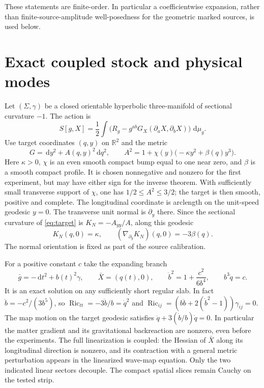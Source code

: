 \documentclass[11pt]{article}
\newcommand{\dd}{\,\mathrm d}
\newcommand{\Ric}{\operatorname{Ric}}
\numberwithin{equation}{section}
\begin{document}
These statements are finite-order. In particular a coefficientwise expansion, rather than finite-source-amplitude well-posedness for the geometric marked sources, is used below.

\section{Exact coupled stock and physical modes}\label{sec:stock}

Let $(\Sigma,\gamma)$ be a closed orientable hyperbolic three-manifold of sectional curvature $-1$. The action is
\begin{equation}
 S[g,X]=\frac12\int\big(R_g-g^{ab}G_X(\partial_aX,\partial_bX)\big)\,\dd\mu_g .
 \label{eq:action}
\end{equation}
Use target coordinates $(q,y)$ on $\mathbb R^2$ and the metric
\begin{equation}
 G=\dd y^2+A(q,y)^2\dd q^2,\qquad
 A^2=1+\chi(y)\big(-\kappa y^2+\beta(q)y^3\big).
 \label{eq:target}
\end{equation}
Here $\kappa>0$, $\chi$ is an even smooth compact bump equal to one near zero, and $\beta$ is a smooth compact profile. It is chosen nonnegative and nonzero for the first experiment, but may have either sign for the inverse theorem. With sufficiently small transverse support of $\chi$, one has $1/2\leq A^2\leq3/2$; the target is then smooth, positive and complete. The longitudinal coordinate is arclength on the unit-speed geodesic $y=0$. The transverse unit normal is $\partial_y$ there. Since the sectional curvature of \eqref{eq:target} is $K_N=-A_{yy}/A$, along this geodesic
\begin{equation}
 K_N(q,0)=\kappa,\qquad
 (\nabla_{\partial_y}K_N)(q,0)=-3\beta(q).
 \label{eq:grad}
\end{equation}
The normal orientation is fixed as part of the source calibration.

For a positive constant $c$ take the expanding branch
\begin{equation}
 \bar g=-\dd t^2+b(t)^2\gamma,\qquad
 \bar X=(q(t),0),\qquad
 \dot b^2=1+\frac{c^2}{6b^4},\qquad b^3\dot q=c.
 \label{eq:stock}
\end{equation}
It is an exact solution on any sufficiently short regular slab. In fact $\ddot b=-c^2/(3b^5)$, so
$\Ric_{tt}=-3\ddot b/b=\dot q^2$ and
$\Ric_{ij}=(b\ddot b+2(\dot b^2-1))\gamma_{ij}=0$.
The map motion on the target geodesic satisfies $\ddot q+3(\dot b/b)\dot q=0$. In particular the matter gradient and its gravitational backreaction are nonzero, even before the experiments. The full linearization is coupled: the Hessian of $\bar X$ along its longitudinal direction is nonzero, and its contraction with a general metric perturbation appears in the linearized wave-map equation. Only the two indicated linear sectors decouple. The compact spatial slices remain Cauchy on the tested strip.
\end{document}
